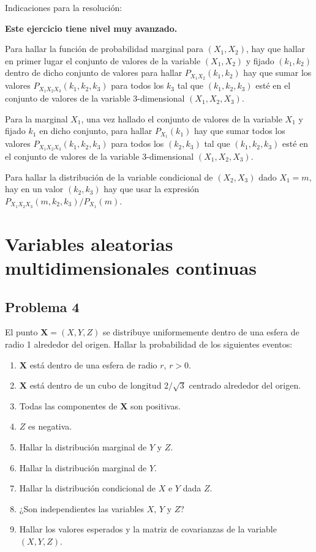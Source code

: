 \documentclass[
]{article}
\providecommand{\tightlist}{%
  \setlength{\itemsep}{0pt}\setlength{\parskip}{0pt}}
\begin{document}
Indicaciones para la resolución:

\textbf{Este ejercicio tiene nivel muy avanzado.}

Para hallar la función de probabilidad marginal para \((X_1,X_2)\), hay
que hallar en primer lugar el conjunto de valores de la variable
\((X_1,X_2)\) y fijado \((k_1,k_2)\) dentro de dicho conjunto de valores
para hallar \(P_{X_1 X_2}(k_1,k_2)\) hay que sumar los valores
\(P_{X_1 X_2 X_3}(k_1,k_2,k_3)\) para todos los \(k_3\) tal que
\((k_1,k_2,k_3)\) esté en el conjunto de valores de la variable
3-dimensional \((X_1,X_2,X_3)\).

Para la marginal \(X_1\), una vez hallado el conjunto de valores de la
variable \(X_1\) y fijado \(k_1\) en dicho conjunto, para hallar
\(P_{X_1}(k_1)\) hay que sumar todos los valores
\(P_{X_1 X_2 X_3}(k_1,k_2,k_3)\) para todos los \((k_2,k_3)\) tal que
\((k_1,k_2,k_3)\) esté en el conjunto de valores de la variable
3-dimensional \((X_1,X_2,X_3)\).

Para hallar la distribución de la variable condicional de \((X_2,X_3)\)
dado \(X_1=m\), hay en un valor \((k_2,k_3)\) hay que usar la expresión
\(P_{X_1 X_2 X_3}(m,k_2,k_3)/P_{X_1}(m)\).

\hypertarget{variables-aleatorias-multidimensionales-continuas}{%
\section{Variables aleatorias multidimensionales
continuas}\label{variables-aleatorias-multidimensionales-continuas}}

\hypertarget{problema-4}{%
\subsection{Problema 4}\label{problema-4}}

El punto \(\mathbf{X} = (X, Y, Z)\) se distribuye uniformemente dentro
de una esfera de radio 1 alrededor del origen. Hallar la probabilidad de
los siguientes eventos:

\begin{enumerate}
\def\labelenumi{\arabic{enumi}.}
\tightlist
\item
  \(\mathbf{X}\) está dentro de una esfera de radio \(r\), \(r >0\).
\item
  \(\mathbf{X}\) está dentro de un cubo de longitud \(2/\sqrt{3}\)
  centrado alrededor del origen.
\item
  Todas las componentes de \(\mathbf{X}\) son positivas.
\item
  \(Z\) es negativa.
\item
  Hallar la distribución marginal de \(Y\) y \(Z\).
\item
  Hallar la distribución marginal de \(Y\).
\item
  Hallar la distribución condicional de \(X\) e \(Y\) dada \(Z\).
\item
  ¿Son independientes las variables \(X\), \(Y\) y \(Z\)?
\item
  Hallar los valores esperados y la matriz de covarianzas de la variable
  \((X,Y,Z)\).
\end{enumerate}
\end{document}
